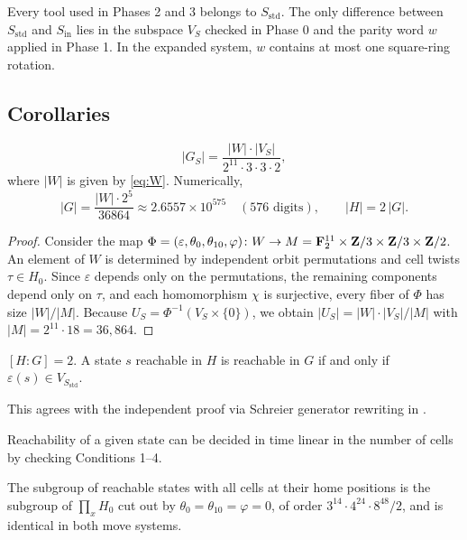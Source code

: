 \documentclass[a4paper,11pt]{article}
\begin{document}
\begin{remark}
Every tool used in Phases 2 and 3 belongs to $S_{\mathrm{std}}$.
The only difference between $S_{\mathrm{std}}$ and $S_{\mathrm{in}}$ lies in the subspace $V_S$ checked in Phase 0 and the parity word $w$ applied in Phase 1.
In the expanded system, $w$ contains at most one square-ring rotation.
\end{remark}

\subsection{Corollaries}

\begin{corollary}\label{cor:order}
\[
|G_S|=\frac{|W|\cdot|V_S|}{2^{11}\cdot3\cdot3\cdot2},
\]
where $|W|$ is given by \eqref{eq:W}. Numerically,
\[
|G|=\frac{|W|\cdot2^5}{36864}\approx2.6557\times10^{575}\quad(576\text{ digits}),\qquad |H|=2\,|G|.
\]
\end{corollary}

\begin{proof}
Consider the map $\Phi=(\varepsilon,\theta_0,\theta_{10},\varphi)\colon W\to M=\mathbf{F}_2^{11}\times\mathbf{Z}/3\times\mathbf{Z}/3\times\mathbf{Z}/2$.
An element of $W$ is determined by independent orbit permutations and cell twists $\tau\in H_0$.
Since $\varepsilon$ depends only on the permutations, the remaining components depend only on $\tau$, and each homomorphism $\chi$ is surjective, every fiber of $\Phi$ has size $|W|/|M|$.
Because $U_S=\Phi^{-1}(V_S\times\{0\})$, we obtain $|U_S|=|W|\cdot|V_S|/|M|$ with $|M|=2^{11}\cdot18=36{,}864$.
\end{proof}

\begin{corollary}\label{cor:index}
$[H:G]=2$. A state $s$ reachable in $H$ is reachable in $G$ if and only if $\varepsilon(s)\in V_{S_{\mathrm{std}}}$.
\end{corollary}

This agrees with the independent proof via Schreier generator rewriting in .

\begin{corollary}
Reachability of a given state can be decided in time linear in the number of cells by checking Conditions 1--4.
\end{corollary}

\begin{corollary}
The subgroup of reachable states with all cells at their home positions is the subgroup of $\prod_xH_0$ cut out by $\theta_0=\theta_{10}=\varphi=0$, of order $3^{14}\cdot4^{24}\cdot8^{48}/2$, and is identical in both move systems.
\end{corollary}
\end{document}
